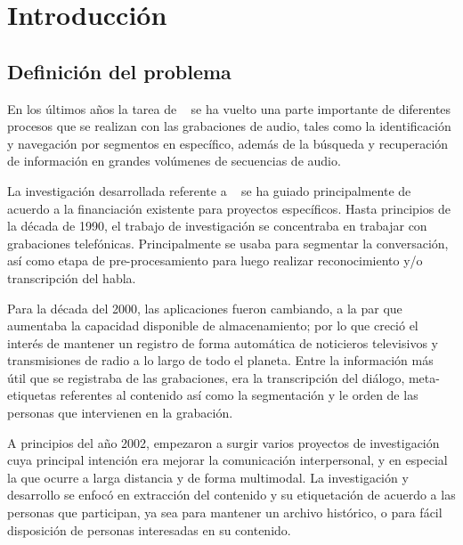 
\chapter{Introducción}\label{ch:chap1}


\section{Definición del problema} 
\label{sec:definicion}
        
En los últimos años la tarea de \SD~ se ha vuelto una parte importante de diferentes procesos que se realizan con las grabaciones de audio, tales como la identificación y navegación por segmentos en específico, además de la búsqueda y recuperación de información en grandes volúmenes de secuencias de audio.

La investigación desarrollada referente a \sd~ se ha guiado principalmente de acuerdo a la financiación existente para proyectos específicos. Hasta principios de la década de 1990, el trabajo de investigación se concentraba en trabajar con grabaciones telefónicas. Principalmente se usaba para segmentar la conversación, así como etapa de pre-procesamiento para luego realizar reconocimiento y/o transcripción del habla.

Para la década del 2000, las aplicaciones fueron cambiando, a la par que aumentaba la capacidad disponible de almacenamiento; por lo que creció el interés de mantener un registro de forma automática de noticieros televisivos  y transmisiones de radio a lo largo de todo el planeta. Entre la información más útil que se registraba de las grabaciones, era la transcripción del diálogo, meta-etiquetas referentes al contenido así como la segmentación y le orden de las personas que intervienen en la grabación.

A principios del año 2002, empezaron a surgir varios proyectos de investigación cuya principal intención era mejorar la comunicación interpersonal, y en especial la que ocurre a larga distancia y de forma multimodal. La investigación y desarrollo se enfocó en extracción del contenido y su etiquetación de acuerdo a las personas que participan, ya sea para mantener un archivo histórico, o para fácil disposición de personas interesadas en su contenido.


